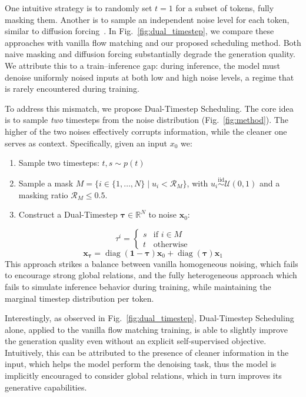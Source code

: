 One intuitive strategy is to randomly set $t=1$ for a subset of tokens, fully masking them. Another is to sample an independent noise level for each token, similar to diffusion forcing~\cite{chen2024diffusion}. In Fig.~\ref{fig:dual_timestep}, we compare these approaches with vanilla flow matching and our proposed scheduling method. Both naive masking and diffusion forcing substantially degrade the generation quality. We attribute this to a train--inference gap: during inference, the model must denoise uniformly noised inputs at both low and high noise levels, a regime that is rarely encountered during training.


To address this mismatch, we propose Dual-Timestep Scheduling.
The core idea is to sample \emph{two} timesteps from the noise distribution (Fig.~\ref{fig:method}). The higher of the two noises effectively corrupts information, while the cleaner one serves as context. Specifically, given an input $x_0$ we:

\begin{enumerate}
    \item Sample two timesteps: $t, s \sim p(t)$
        \item Sample a mask ${M} = \{ i \in \{1, \dots, N\} \mid u_i < \mathcal{R}_{M} \}$, with $u_i \stackrel{\text{iid}}{\sim} \mathcal{U}(0, 1)$ and a masking ratio $\mathcal{R}_{M} \leq 0.5$.
    \item 
    Construct a Dual-Timestep $\boldsymbol{\tau} \in \mathbb{R}^{N}$ to noise $\mathbf{x}_0$:
\end{enumerate}
\begin{equation}
{\tau}^i = \begin{cases}
        s & \text{if }i \in {M} \\
        t & \text{otherwise}
        \end{cases}
\end{equation}
    \begin{equation}
        \mathbf{x}_{\boldsymbol{\tau}} =  \operatorname{diag} ( \mathbf{1} - \boldsymbol{\tau}) \mathbf{x}_0 + \operatorname{diag} ( \boldsymbol{\tau} )  \mathbf{x}_1
      \end{equation}
This approach strikes a balance between vanilla homogeneous noising, which fails to encourage strong global relations, and the fully heterogeneous approach which fails to simulate inference behavior during training, while maintaining the marginal timestep distribution per token.

Interestingly, as observed in Fig.~\ref{fig:dual_timestep}, Dual-Timestep Scheduling alone, applied to the vanilla flow matching training, is able to slightly improve the generation quality even without an explicit self-supervised objective. Intuitively, this can be attributed to the presence of cleaner information in the input, which helps the model perform the denoising task, thus the model is implicitly encouraged to consider global relations, which in turn improves its generative capabilities.

